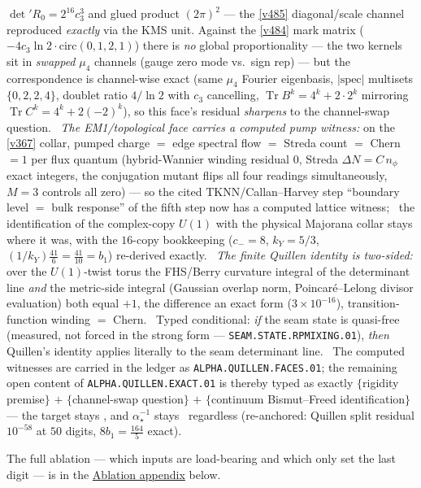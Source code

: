 \documentclass[11pt,a4paper]{article}
\newcommand{\cthree}{c_3}
\newcommand{\ainv}{\alpha^{-1}_\star}
\theoremstyle{definition}
\begin{document}
$\det\nolimits'R_0=2^{16}\cthree^3$ and glued product $(2\pi)^2$ --- the \vref{v485} diagonal/scale
channel reproduced \emph{exactly} via the KMS unit. Against the \vref{v484} mark matrix
($-4\cthree\ln2\cdot\mathrm{circ}(0,1,2,1)$) there is \emph{no} global proportionality --- the two
kernels sit in \emph{swapped} $\mu_4$ channels (gauge zero mode vs.\ sign rep) --- but the
correspondence is channel-wise exact (same $\mu_4$ Fourier eigenbasis, $|\mathrm{spec}|$ multisets
$\{0,2,2,4\}$, doublet ratio $4/\ln2$ with $\cthree$ cancelling,
$\operatorname{Tr}B^k=4^k+2\cdot2^k$ mirroring $\operatorname{Tr}C^k=4^k+2(-2)^k$), so this face's
residual \emph{sharpens} to the channel-swap question. \mE\ \emph{The EM1/topological face carries a
computed pump witness:} on the \vref{v367} collar, pumped charge $=$ edge spectral flow $=$ Streda
count $=$ Chern $=1$ per flux quantum (hybrid-Wannier winding residual $0$, Streda
$\Delta N=C\,n_\phi$ exact integers, the conjugation mutant flips all four readings simultaneously,
$M{=}3$ controls all zero) --- so the cited TKNN/Callan--Harvey step ``boundary level $=$ bulk
response'' of the fifth step now has a computed lattice witness; \mC\ the identification of the
complex-copy $U(1)$ with the physical Majorana collar stays where it was, with the $16$-copy
bookkeeping ($c_-{=}8$, $k_Y{=}5/3$, $(1/k_Y)\tfrac{41}6=\tfrac{41}{10}=b_1$) re-derived exactly.
\mE\ \emph{The finite Quillen identity is two-sided:} over the $U(1)$-twist torus the FHS/Berry
curvature integral of the determinant line \emph{and} the metric-side integral (Gaussian overlap norm,
Poincar\'e--Lelong divisor evaluation) both equal $+1$, the difference an exact form
($3\times10^{-16}$), transition-function winding $=$ Chern. \mC\ Typed conditional: \emph{if} the seam
state is quasi-free (measured, not forced in the strong form --- \texttt{SEAM.STATE.RPMIXING.01}),
\emph{then} Quillen's identity applies literally to the seam determinant line. \mE\ The computed
witnesses are carried in the ledger as \texttt{ALPHA.QUILLEN.FACES.01}; the remaining open content of
\texttt{ALPHA.QUILLEN.EXACT.01} is thereby typed as exactly $\{$rigidity premise$\}$ $+$
$\{$channel-swap question$\}$ $+$ $\{$continuum Bismut--Freed identification$\}$ --- the target stays
\mO, and $\ainv$ stays \mE\ regardless (re-anchored: Quillen split residual $10^{-58}$ at $50$ digits,
$8b_1=\tfrac{164}5$ exact).
\par\smallskip

\noindent The full ablation --- which inputs are load-bearing and which only set the last digit --- is in
the \hyperref[sec:ablation]{Ablation appendix} below.
\end{document}
